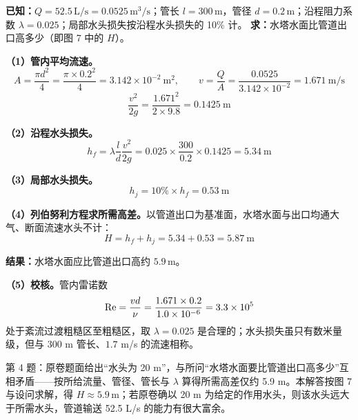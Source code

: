 
\begin{jie}
\textbf{已知：}$Q=52.5\,\mathrm{L/s}=0.0525\,\mathrm{m^3/s}$；管长 $l=300\,\mathrm{m}$，管径 $d=0.2\,\mathrm{m}$；沿程阻力系数 $\lambda=0.025$；局部水头损失按沿程水头损失的 10\% 计。
\textbf{求：}水塔水面比管道出口高多少（即图 7 中的 $H$）。

\textbf{（1）管内平均流速。}
\[
A=\frac{\pi d^2}{4}=\frac{\pi\times0.2^2}{4}=3.142\times10^{-2}\ \mathrm{m^2},\qquad v=\frac{Q}{A}=\frac{0.0525}{3.142\times10^{-2}}=1.671\ \mathrm{m/s}
\]
\[
\frac{v^2}{2g}=\frac{1.671^2}{2\times9.8}=0.1425\ \mathrm{m}
\]

\textbf{（2）沿程水头损失。}
\[
h_f=\lambda\frac{l}{d}\frac{v^2}{2g}=0.025\times\frac{300}{0.2}\times0.1425=5.34\ \mathrm{m}
\]

\textbf{（3）局部水头损失。}
\[
h_j=10\%\times h_f=0.53\ \mathrm{m}
\]

\textbf{（4）列伯努利方程求所需高差。}以管道出口为基准面，水塔水面与出口均通大气、断面流速水头不计：
\[
H=h_f+h_j=5.34+0.53=5.87\ \mathrm{m}
\]

\textbf{结果：}水塔水面应比管道出口高约 $5.9\,\mathrm{m}$。

\textbf{（5）校核。}管内雷诺数
\[
\mathrm{Re}=\frac{vd}{\nu}=\frac{1.671\times0.2}{1.0\times10^{-6}}=3.3\times10^{5}
\]
处于紊流过渡粗糙区至粗糙区，取 $\lambda=0.025$ 是合理的；水头损失虽只有数米量级，但与 $300$ m 管长、$1.7$ m/s 的流速相称。
\end{jie}

\begin{tishi}
第 4 题：原卷题面给出“水头为 20 m”，与所问“水塔水面要比管道出口高多少”互相矛盾——按所给流量、管径、管长与 $\lambda$ 算得所需高差仅约 5.9 m。本解答按图 7 与设问求解，得 $H\approx5.9\,\mathrm{m}$；若原卷确以 20 m 为给定的作用水头，则该水头远大于所需水头，管道输送 52.5 L/s 的能力有很大富余。
\end{tishi}


